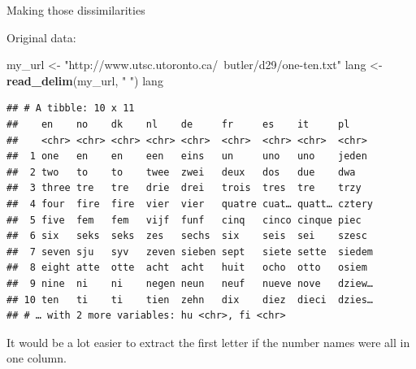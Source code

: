 \documentclass[ignorenonframetext,]{beamer}
\newenvironment{Shaded}{\begin{snugshade}}{\end{snugshade}}
\newcommand{\KeywordTok}[1]{\textcolor[rgb]{0.13,0.29,0.53}{\textbf{#1}}}
\newcommand{\NormalTok}[1]{#1}
\newcommand{\StringTok}[1]{\textcolor[rgb]{0.31,0.60,0.02}{#1}}
\begin{document}
\begin{frame}[fragile]{Making those dissimilarities}
\protect\hypertarget{making-those-dissimilarities}{}

Original data:

\footnotesize

\begin{Shaded}
\begin{Highlighting}[]
\NormalTok{my_url <-}\StringTok{ "http://www.utsc.utoronto.ca/~butler/d29/one-ten.txt"}
\NormalTok{lang <-}\StringTok{ }\KeywordTok{read_delim}\NormalTok{(my_url, }\StringTok{" "}\NormalTok{)}
\NormalTok{lang}
\end{Highlighting}
\end{Shaded}

\begin{verbatim}
## # A tibble: 10 x 11
##    en    no    dk    nl    de     fr     es    it     pl    
##    <chr> <chr> <chr> <chr> <chr>  <chr>  <chr> <chr>  <chr> 
##  1 one   en    en    een   eins   un     uno   uno    jeden 
##  2 two   to    to    twee  zwei   deux   dos   due    dwa   
##  3 three tre   tre   drie  drei   trois  tres  tre    trzy  
##  4 four  fire  fire  vier  vier   quatre cuat… quatt… cztery
##  5 five  fem   fem   vijf  funf   cinq   cinco cinque piec  
##  6 six   seks  seks  zes   sechs  six    seis  sei    szesc 
##  7 seven sju   syv   zeven sieben sept   siete sette  siedem
##  8 eight atte  otte  acht  acht   huit   ocho  otto   osiem 
##  9 nine  ni    ni    negen neun   neuf   nueve nove   dziew…
## 10 ten   ti    ti    tien  zehn   dix    diez  dieci  dzies…
## # … with 2 more variables: hu <chr>, fi <chr>
\end{verbatim}

\normalsize

It would be a lot easier to extract the first letter if the number names
were all in one column.

\end{frame}
\end{document}
